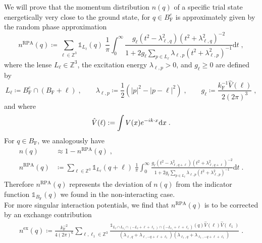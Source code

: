 \documentclass[12pt,a4paper]{article}
\numberwithin{equation}{section}
\newcommand{\1}{\mathbb{I}}
\newcommand{\di}{\textnormal{d}}
\newcommand{\ex}{\mathrm{ex}}
\newcommand{\F}{\mathrm{F}}
\newcommand{\RPA}{\mathrm{RPA}}
\newcommand{\Zstar}{\mathbb{Z}^3} %
\newcommand{\Z}{\mathbb{Z}}
\newcommand{\half}{\frac{1}{2}}
\theoremstyle{plain}
\theoremstyle{definition}
\theoremstyle{remark}
\theoremstyle{plain}
\theoremstyle{definition}
\theoremstyle{remark}
\begin{document}
We will prove that the momentum distribution $ n(q) $ of a specific trial state energetically very close to the ground state, for $ q \in B_{\F}^c $ is approximately given by the random phase approximation
\begin{equation} \label{eq:nqb}
	n^{\RPA}(q)
	\coloneq \sum_{\ell \in \Zstar}\mathds{1}_{L_{\ell}}(q) \; \frac{1}{\pi}\int_0^\infty \frac{g_\ell (t^2-\lambda^2_{\ell,q}) (t^2 + \lambda^2_{\ell,q})^{-2}}{1 + 2g_\ell \sum_{p \in L_{\ell}}\lambda_{\ell,p} (t^2+\lambda^2_{\ell,p})^{-1}} \mathrm{d}t \;,
\end{equation}
where the lense $ L_\ell \in \Z^3 $, the excitation energy $ \lambda_{\ell,p} > 0 $, and $ g_\ell \ge 0 $ are defined by
\begin{equation} \label{eq:Lell}
	L_\ell \coloneq B_{\F}^c \cap (B_{\F} + \ell) \;, \qquad
	\lambda_{\ell,p} \coloneq \half (|p|^2 - |p-\ell|^2) \;, \qquad
	g_\ell \coloneq \frac{k_{\F}^{-1} \hat{V}(\ell) }{2 (2 \pi)^3} \;,
\end{equation}
and where
\begin{equation} \label{eq:Fourierconvention}
	\hat{V}(\ell) := \int V(x) e^{-i k \cdot x} \di x \;.
\end{equation}
For $ q \in B_{\F} $, we analogously have
\begin{equation}\label{eq:inside}
\begin{split}
	n(q) & \approx 1 - n^{\RPA}(q) \;, \\
	n^{\RPA}(q) & 	\coloneq \sum_{\ell \in \Zstar}\mathds{1}_{L_{\ell}}(q+\ell) \; \frac{1}{\pi}\int_0^\infty \frac{g_\ell (t^2-\lambda^2_{\ell,q+\ell}) (t^2 + \lambda^2_{\ell,q+\ell})^{-2}}{1 + 2g_\ell \sum_{p \in L_{\ell}}\lambda_{\ell,p} (t^2+\lambda^2_{\ell,p})^{-1}} \mathrm{d}t \;.
\end{split}
\end{equation}
Therefore $ n^{\RPA}(q) $ represents the deviation of $ n(q) $ from the indicator function $ \mathds{1}_{B_{\F}}(q) $ we found in the non-interacting case.\\
For more singular interaction potentials, we find that $ n^{\RPA}(q) $ is to be corrected by an exchange contribution
\begin{equation} \label{eq:nqex}
\begin{split}
	n^{\ex}(q)
	\coloneq 
	\frac{k_{\F}^{-2}}{4 (2 \pi)^6} \sum_{\ell,\ell_1 \in \Zstar}
		\frac{ \mathds{1}_{L_\ell \cap L_{\ell_1} \cap (-L_{\ell}+\ell+\ell_1) \cap (-L_{\ell_1}+\ell+\ell_1)}(q)
		\hat{V}(\ell)
		\hat{V}(\ell_1)}
		{(\lambda_{\ell,q} + \lambda_{\ell,-q+\ell+\ell_1})
		(\lambda_{\ell_1,q} + \lambda_{\ell_1,-q+\ell+\ell_1})} \;.
\end{split}
\end{equation}
\end{document}
